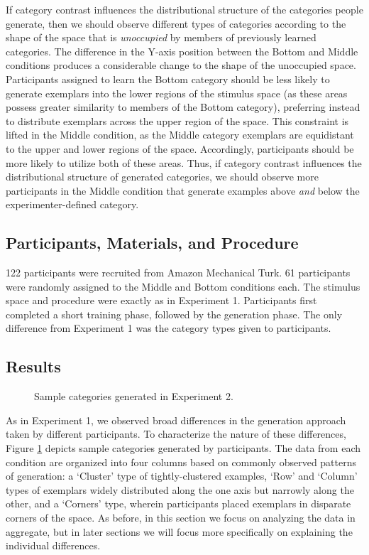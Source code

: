 \documentclass[12pt]{article}
\newcommand\inputpgf[2]{{
\let\pgfimageWithoutPath\pgfimage
\renewcommand{\pgfimage}[2][]{\pgfimageWithoutPath[##1]{#1/##2}}

}}
\begin{document}
\begin{flushleft}
If category contrast influences the distributional structure of the categories people generate, then we should observe different types of categories according to the shape of the space that is {\em unoccupied} by members of previously learned categories. The difference in the Y-axis position between the Bottom and Middle conditions produces a considerable change to the shape of the unoccupied space. Participants assigned to learn the Bottom category should be less likely to generate exemplars into the lower regions of the stimulus space (as these areas possess greater similarity to members of the Bottom category), preferring instead to distribute exemplars across the upper region of the space. This constraint is lifted in the Middle condition, as the Middle category exemplars are equidistant to the upper and lower regions of the space. Accordingly, participants should be more likely to utilize both of these areas. Thus, if category contrast influences the distributional structure of generated categories, we should observe more participants in the Middle condition that generate examples above {\em and} below the experimenter-defined category.


\subsection{Participants, Materials, and Procedure}

122 participants were recruited from Amazon Mechanical Turk. 61 participants were randomly assigned to the Middle and Bottom conditions each. The stimulus space and procedure were exactly as in Experiment 1. Participants first completed a short training phase, followed by the generation phase. The only difference from Experiment 1 was the category types given to participants.


\subsection{Results}

\begin{figure}
    \begin{center}
    \inputpgf{figs/}{e2-samples.pgf}
    \caption{Sample categories generated in Experiment 2. }
    \label{fig:e2-samples}
    \end{center}
\end{figure}


As in Experiment 1, we observed broad differences in the generation approach taken by different participants.  To characterize the nature of these differences, Figure \ref{fig:e2-samples} depicts sample categories generated by participants. The data from each condition are organized into four columns based on commonly observed patterns of generation: a `Cluster' type of tightly-clustered examples,   `Row' and `Column' types of exemplars widely distributed along the one axis but narrowly along the other, and a `Corners' type, wherein participants placed exemplars in disparate corners of the space. As before, in this section we focus on analyzing the data in aggregate, but in later sections we will focus more specifically on explaining the individual differences.


\end{flushleft}
\end{document}
